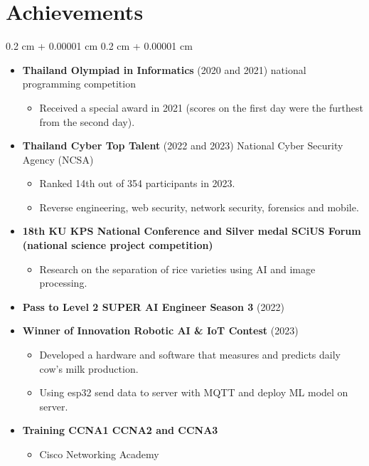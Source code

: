 \documentclass[10pt,letterpaper]{extarticle}
\newenvironment{highlights}{
    \begin{itemize}[
        topsep=0.10 cm,
        parsep=0.10 cm,
        partopsep=0pt,
        itemsep=0pt,
        leftmargin=0.4 cm + 10pt
    ]
}{
    \end{itemize}
} %
\newenvironment{onecolentry}{
    \begin{adjustwidth}{
        0.2 cm + 0.00001 cm
    }{
        0.2 cm + 0.00001 cm
    }
}{
    \end{adjustwidth}
} %
\begin{document}
    \section{Achievements}
        \begin{onecolentry}
            \begin{highlights}
                \item \textbf{Thailand Olympiad in Informatics} (2020 and 2021) national programming competition
                    \begin{highlights}
                        \item Received a special award in 2021 (scores on the first day were the furthest from the second day).
                    \end{highlights}
                
                \item \textbf{Thailand Cyber Top Talent} (2022 and 2023) National Cyber Security Agency (NCSA)
                    \begin{highlights}
                        \item Ranked 14th out of 354 participants in 2023.
                        \item Reverse engineering, web security, network security, forensics and mobile.
                    \end{highlights}

                \item \textbf{18th KU KPS National Conference and Silver medal SCiUS Forum (national science project competition)}
                    \begin{highlights}
                        \item Research on the separation of rice varieties using AI and image processing.
                    \end{highlights}
                \item \textbf{Pass to Level 2 SUPER AI Engineer Season 3} (2022)

                \item \textbf{Winner of Innovation Robotic AI \& IoT Contest} (2023)
                    \begin{highlights}
                        \item Developed a hardware and software that measures and predicts daily cow's milk production.
                        \item Using esp32 send data to server with MQTT and deploy ML model on server.
                    \end{highlights}

                \item \textbf{Training CCNA1 CCNA2 and CCNA3}
                    \begin{highlights}
                        \item Cisco Networking Academy
                    \end{highlights}

            \end{highlights}
        \end{onecolentry}
\end{document}
